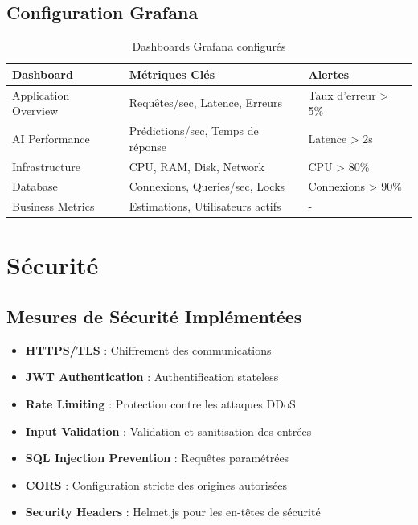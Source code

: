 \subsection{Configuration Grafana}

\begin{table}[H]
\centering
\caption{Dashboards Grafana configurés}
\begin{tabular}{|l|l|l|}
\hline
\textbf{Dashboard} & \textbf{Métriques Clés} & \textbf{Alertes} \\
\hline
Application Overview & Requêtes/sec, Latence, Erreurs & Taux d'erreur > 5\% \\
AI Performance & Prédictions/sec, Temps de réponse & Latence > 2s \\
Infrastructure & CPU, RAM, Disk, Network & CPU > 80\% \\
Database & Connexions, Queries/sec, Locks & Connexions > 90\% \\
Business Metrics & Estimations, Utilisateurs actifs & - \\
\hline
\end{tabular}
\label{tab:dashboards_grafana}
\end{table}

\section{Sécurité}

\subsection{Mesures de Sécurité Implémentées}

\begin{itemize}
    \item \textbf{HTTPS/TLS} : Chiffrement des communications
    \item \textbf{JWT Authentication} : Authentification stateless
    \item \textbf{Rate Limiting} : Protection contre les attaques DDoS
    \item \textbf{Input Validation} : Validation et sanitisation des entrées
    \item \textbf{SQL Injection Prevention} : Requêtes paramétrées
    \item \textbf{CORS} : Configuration stricte des origines autorisées
    \item \textbf{Security Headers} : Helmet.js pour les en-têtes de sécurité
\end{itemize}

